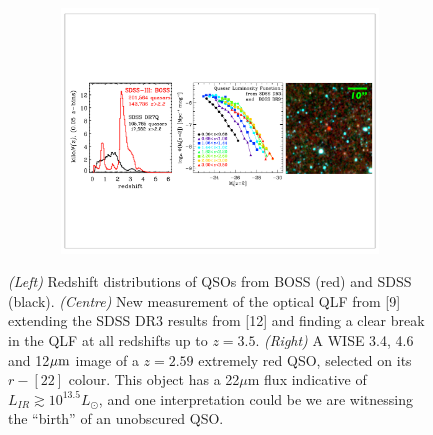 \documentclass[11pt,epsf]{article}
\begin{document}
\begin{figure}[h]
  \begin{center}
   \hspace{-0.5cm}
    \includegraphics[height=6.5cm,width=18.2cm]
   {figs/3_panels_Nofz_QLF_WISE.pdf}
    \vspace{-10pt}
   \caption{
     \footnotesize
   {\it (Left)} 
   Redshift distributions of QSOs from BOSS (red) and SDSS (black).
    {\it (Centre)}  
    New measurement of the optical QLF from [9] extending the SDSS DR3
    results from [12] and finding a clear break in the QLF at all
    redshifts up to $z=3.5$.
    {\it (Right)} 
    A WISE 3.4, 4.6 and 12$\mu {\rm m}$ image of a $z=2.59$ 
    extremely red QSO, selected on its $r-[22]$ colour. This object
    has a 22$\mu$m flux indicative of $L_{IR} \gtrsim 10^{13.5} L_{\odot}$, 
    and one interpretation could be we are witnessing the
    ``birth'' of an unobscured QSO.  }
  \vspace{-14pt}
 \label{figtest-fig}
\end{center}
\end{figure}
\end{document}
